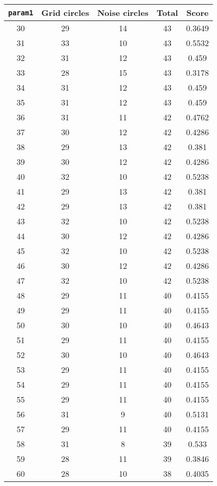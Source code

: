 \documentclass[letterpaper, 12pt]{article}
\begin{document}
\begin{longtable}{|c|c|c|c|c|}
\hline
\textbf{\texttt{param1}} & \textbf{Grid circles} & \textbf{Noise circles} & \textbf{Total} & \textbf{Score} \\
\hline
30 & 29 & 14 & 43 & 0.3649 \\
\hline
31 & 33 & 10 & 43 & 0.5532 \\
\hline
32 & 31 & 12 & 43 & 0.459 \\
\hline
33 & 28 & 15 & 43 & 0.3178 \\
\hline
34 & 31 & 12 & 43 & 0.459 \\
\hline
35 & 31 & 12 & 43 & 0.459 \\
\hline
36 & 31 & 11 & 42 & 0.4762 \\
\hline
37 & 30 & 12 & 42 & 0.4286 \\
\hline
38 & 29 & 13 & 42 & 0.381 \\
\hline
39 & 30 & 12 & 42 & 0.4286 \\
\hline
40 & 32 & 10 & 42 & 0.5238 \\
\hline
41 & 29 & 13 & 42 & 0.381 \\
\hline
42 & 29 & 13 & 42 & 0.381 \\
\hline
43 & 32 & 10 & 42 & 0.5238 \\
\hline
44 & 30 & 12 & 42 & 0.4286 \\
\hline
45 & 32 & 10 & 42 & 0.5238 \\
\hline
46 & 30 & 12 & 42 & 0.4286 \\
\hline
47 & 32 & 10 & 42 & 0.5238 \\
\hline
48 & 29 & 11 & 40 & 0.4155 \\
\hline
49 & 29 & 11 & 40 & 0.4155 \\
\hline
50 & 30 & 10 & 40 & 0.4643 \\
\hline
51 & 29 & 11 & 40 & 0.4155 \\
\hline
52 & 30 & 10 & 40 & 0.4643 \\
\hline
53 & 29 & 11 & 40 & 0.4155 \\
\hline
54 & 29 & 11 & 40 & 0.4155 \\
\hline
55 & 29 & 11 & 40 & 0.4155 \\
\hline
56 & 31 & 9 & 40 & 0.5131 \\
\hline
57 & 29 & 11 & 40 & 0.4155 \\
\hline
58 & 31 & 8 & 39 & 0.533 \\
\hline
59 & 28 & 11 & 39 & 0.3846 \\
\hline
60 & 28 & 10 & 38 & 0.4035 \\

\end{longtable}
\end{document}
